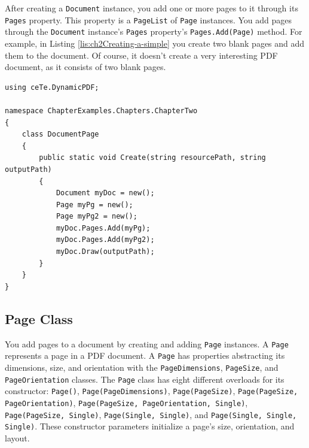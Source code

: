 \documentclass[american]{tufte-book}
\numberwithin{equation}{section}
\numberwithin{figure}{section}
\begin{document}
After creating a \texttt{Document} instance, you add one or more pages
to it through its \texttt{Pages} property. This property is a \texttt{PageList}
of \texttt{Page} instances. You add pages through the \texttt{Document}
instance's \texttt{Pages} property's \texttt{Pages.Add(Page)} method.
For example, in Listing \ref{lis:ch2Creating-a-simple} you create
two blank pages and add them to the document. Of course, it doesn't create a
very interesting PDF document, as it consists of two blank pages.

\bgroup{}
\begin{lstlisting}[caption={Creating a simple PDF Document.},label={lis:ch2Creating-a-simple},basicstyle={\footnotesize\ttfamily},breaklines=true]
using ceTe.DynamicPDF;

namespace ChapterExamples.Chapters.ChapterTwo
{
    class DocumentPage
    {
        public static void Create(string resourcePath, string outputPath)
        {
            Document myDoc = new();
            Page myPg = new();
            Page myPg2 = new();
            myDoc.Pages.Add(myPg);
            myDoc.Pages.Add(myPg2);
            myDoc.Draw(outputPath);
        }
    }
}
\end{lstlisting}
\leavevmode\egroup


\subsection{Page Class}
You add pages to a document by creating and adding \texttt{Page} instances.
A \texttt{Page} represents a page in a PDF document. A \texttt{Page}
has properties abstracting its dimensions, size, and orientation with
the \texttt{PageDimensions}, \texttt{PageSize}, and \texttt{PageOrientation}
classes. The \texttt{Page} class has eight different overloads for its constructor:
\texttt{Page()}, \texttt{Page(PageDimensions)}, \texttt{Page(PageSize)},
\texttt{Page(PageSize, PageOrientation)}, \texttt{Page(PageSize, PageOrientation,
Single)}, \texttt{Page(PageSize, Single)}, \texttt{Page(Single, Single)},
and \texttt{Page(Single, Single, Single)}. These constructor parameters
initialize a page's size, orientation, and layout.
\end{document}
